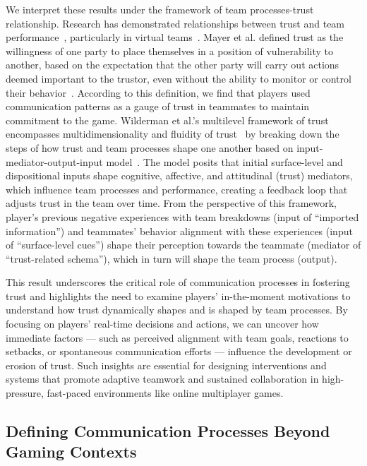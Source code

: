 We interpret these results under the framework of team processes-trust relationship. Research has demonstrated relationships between trust and team performance~\cite{erdem2003cognitive, kanawattanachai2002dynamic}, particularly in virtual teams~\cite{powell2006antecedents}. Mayer et al. defined trust as the willingness of one party to place themselves in a position of vulnerability to another, based on the expectation that the other party will carry out actions deemed important to the trustor, even without the ability to monitor or control their behavior~\cite{mayer1995trust}. According to this definition, we find that players used communication patterns as a gauge of trust in teammates to maintain commitment to the game. Wilderman et al.'s multilevel framework of trust encompasses multidimensionality and fluidity of trust~\cite{dirks2022trust} by breaking down the steps of how trust and team processes shape one another based on input-mediator-output-input model~\cite{wildman2012trust, lines2022meta}. The model posits that initial surface-level and dispositional inputs shape cognitive, affective, and attitudinal (trust) mediators, which influence team processes and performance, creating a feedback loop that adjusts trust in the team over time. From the perspective of this framework, player's previous negative experiences with team breakdowns (input of ``imported information'') and teammates' behavior alignment with these experiences (input of ``surface-level cues'') shape their perception towards the teammate (mediator of ``trust-related schema''), which in turn will shape the team process (output).

This result underscores the critical role of communication processes in fostering trust and highlights the need to examine players' in-the-moment motivations to understand how trust dynamically shapes and is shaped by team processes. By focusing on players' real-time decisions and actions, we can uncover how immediate factors --- such as perceived alignment with team goals, reactions to setbacks, or spontaneous communication efforts --- influence the development or erosion of trust. Such insights are essential for designing interventions and systems that promote adaptive teamwork and sustained collaboration in high-pressure, fast-paced environments like online multiplayer games.


\subsection{Defining Communication Processes Beyond Gaming Contexts}

